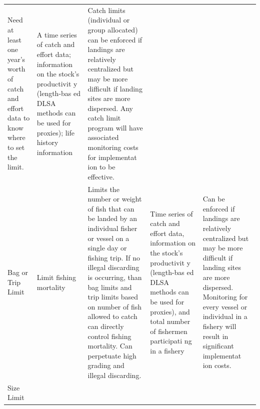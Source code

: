 \documentclass[]{book}
\begin{document}
\begin{longtable}[]{@{}lllll@{}}
\begin{minipage}[t]{0.19\columnwidth}
Need at least one year's worth of catch and effort data to know where to
set the limit.\strut
\end{minipage} & \begin{minipage}[t]{0.19\columnwidth}\raggedright\strut
A time series of catch and effort data; information on the stock's
productivit y (length-bas ed DLSA methods can be used for proxies); life
history information\strut
\end{minipage} & \begin{minipage}[t]{0.19\columnwidth}\raggedright\strut
Catch limits (individual or group allocated) can be enforced if landings
are relatively centralized but may be more difficult if landing sites
are more dispersed. Any catch limit program will have associated
monitoring costs for implementat ion to be effective.\strut
\end{minipage}\tabularnewline
\begin{minipage}[t]{0.17\columnwidth}\raggedright\strut
Bag or Trip Limit\strut
\end{minipage} & \begin{minipage}[t]{0.17\columnwidth}\raggedright\strut
Limit fishing mortality\strut
\end{minipage} & \begin{minipage}[t]{0.17\columnwidth}\raggedright\strut
Limits the number or weight of fish that can be landed by an individual
fisher or vessel on a single day or fishing trip. If no illegal
discarding is occurring, than bag limits and trip limits based on number
of fish allowed to catch can directly control fishing mortality. Can
perpetuate high grading and illegal discarding.\strut
\end{minipage} & \begin{minipage}[t]{0.17\columnwidth}\raggedright\strut
Time series of catch and effort data, information on the stock's
productivit y (length-bas ed DLSA methods can be used for proxies), and
total number of fishermen participati ng in a fishery\strut
\end{minipage} & \begin{minipage}[t]{0.17\columnwidth}\raggedright\strut
Can be enforced if landings are relatively centralized but may be more
difficult if landing sites are more dispersed. Monitoring for every
vessel or individual in a fishery will result in significant implementat
ion costs.\strut
\end{minipage}\tabularnewline
\begin{minipage}[t]{0.17\columnwidth}\raggedright\strut
Size Limit\strut

\end{minipage}
\end{longtable}
\end{document}
